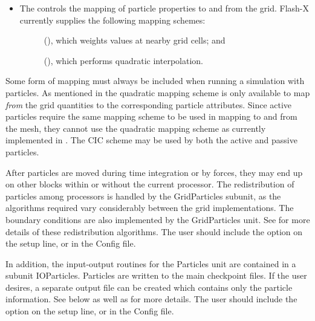 \begin{itemize}
\item The  \subunit controls the mapping of particle properties to and from the grid.
      Flash-X currently supplies the following mapping schemes:
      \begin{description}
      \item[] (), which weights values at nearby grid cells;  and
        \item[] (), which performs quadratic interpolation.
      \end{description}

\end{itemize}
      
      Some form of mapping must always be included when running a
simulation with particles. As mentioned in  the quadratic mapping scheme is only available to map {\em from} the
grid quantities to the corresponding particle attributes. Since active
particles require the same mapping scheme to be used in mapping to and
from the mesh, they cannot use the quadratic mapping scheme as
currently implemented in \flashx. The CIC scheme may be used by both
the active and passive particles. 


After particles are moved during time integration or by forces, 
they may end up on other blocks within or
without the current processor.  The redistribution of particles
among processors is handled by the \unit{GridParticles} subunit, as the
algorithms required vary considerably between the grid
implementations.  The boundary conditions are also implemented by
the GridParticles unit.  See  for more details of these
redistribution algorithms.  The user should include the option  on the
setup line, or  in the Config file.

In addition, the input-output routines for the Particles unit are contained in a
subunit \unit{IOParticles}.  Particles are written to the main checkpoint files.
If the user desires, a separate output file can be created which contains only the
particle information.  See  below as well as
 for more details.  The user should include the option
 on the setup line, or  in the Config file.

